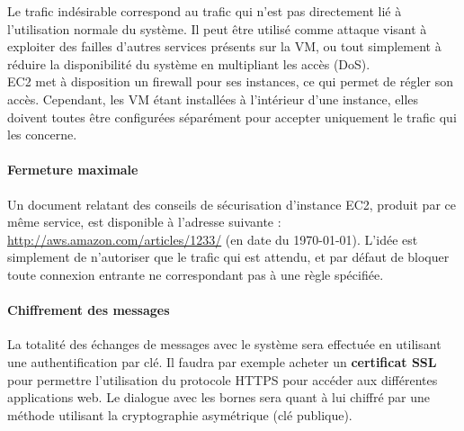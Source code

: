 Le trafic indésirable correspond au trafic qui n'est pas directement lié à
l'utilisation normale du système. Il peut être utilisé comme attaque visant à
exploiter des failles d'autres services présents sur la VM, ou tout
simplement à réduire la disponibilité du système en multipliant les
accès (DoS). \\

EC2 met à disposition un firewall pour ses instances, ce qui permet de régler
son accès. Cependant, les VM étant installées à l'intérieur d'une instance,
elles doivent toutes être configurées séparément pour accepter uniquement le
trafic qui les concerne.

\paragraph{Fermeture maximale}

Un document relatant des conseils de sécurisation d'instance EC2, produit par
ce même service, est disponible à l'adresse suivante :
\url{http://aws.amazon.com/articles/1233/} (en date du \today). L'idée est
simplement de n'autoriser que le trafic qui est attendu, et par défaut de
bloquer toute connexion entrante ne correspondant pas à une règle spécifiée.

\paragraph{Chiffrement des messages}

La totalité des échanges de messages avec le système sera effectuée en
utilisant une authentification par clé. Il faudra par exemple acheter un
\textbf{certificat SSL} pour permettre l'utilisation du protocole HTTPS pour
accéder aux différentes applications web. Le dialogue avec les bornes sera
quant à lui chiffré par une méthode utilisant la cryptographie asymétrique (clé
publique).


